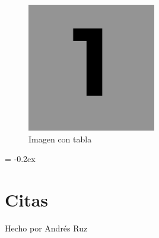 \begin{minipage}[c]{0.5\linewidth}
    \begin{figure}[H]
    	\centering
    	\includegraphics[width=0.5\textwidth]{img/img1.png}
    	\caption{Imagen con tabla}
    	\label{fig:imagentabla}
    \end{figure}
\end{minipage}
\begin{minipage}[c]{0.5\linewidth}
    \begin{table}[H]
    \small
      \centering
        \extrarowheight = -0.2ex
        \renewcommand{\arraystretch}{1.75}
        \noindent{}
        \caption{Tabla con imagen}
      \label{tab:tablaimagen}
    \end{table}
\end{minipage}

\section{Citas}
Hecho por Andrés Ruz \cite{aruznieto}
